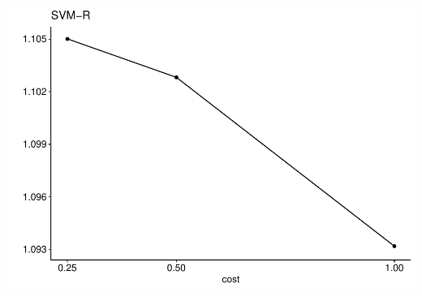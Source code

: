 \documentclass[
]{article}
\begin{document}
\includegraphics{sl-inf-cairs-2301_files/figure-latex/optResults-8.pdf}
\end{document}
